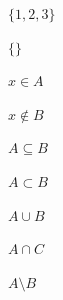 \documentclass[a4paper,10pt,fleqn]{article}
\begin{document}
\noindent
$\{1, 2, 3\}$


\noindent
$\{\}$


\noindent
$x \in A$


\noindent
$x \notin B$


\noindent
$A \subseteq B$


\noindent
$A \subset B$


\noindent
$A \cup B$


\noindent
$A \cap C$


\noindent
$A \setminus B$
\end{document}
